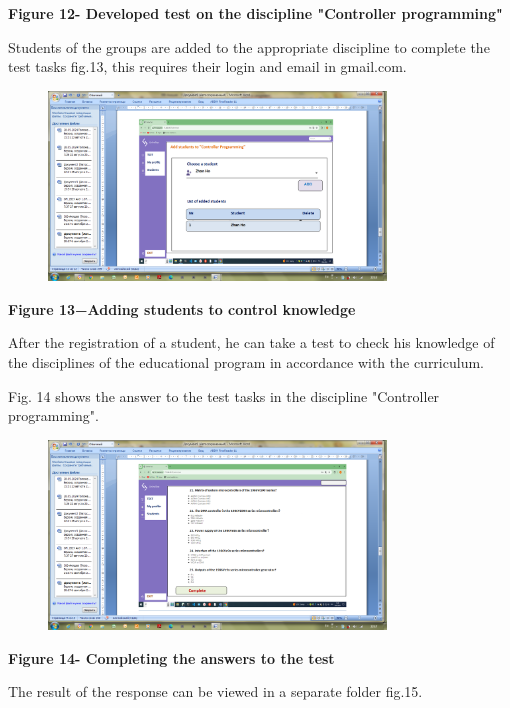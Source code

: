 {\bfseries Figure 12- Developed test on the discipline "Controller
programming"}

Students of the groups are added to the appropriate discipline to
complete the test tasks fig.13, this requires their login and email in
gmail.com.

\begin{figure}[H]
	\centering
	\includegraphics[width=0.8\textwidth]{assets/57}
	\caption*{}
\end{figure}

{\bfseries Figure 13−Adding students to control knowledge}

After the registration of a student, he can take a test to check his
knowledge of the disciplines of the educational program in accordance
with the curriculum.

Fig. 14 shows the answer to the test tasks in the discipline "Controller
programming".

\begin{figure}[H]
	\centering
	\includegraphics[width=0.8\textwidth]{assets/58}
	\caption*{}
\end{figure}

{\bfseries Figure 14- Completing the answers to the test}

The result of the response can be viewed in a separate folder fig.15.

